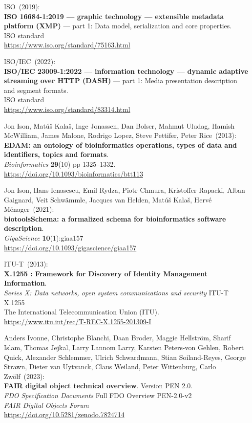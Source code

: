 \begin{thebibliography}{9}
ISO~(2019): \\
\textbf{{ISO} 16684-1:2019 --- graphic technology --- extensible metadata platform (XMP)} --- part 1: Data model, serialization and core properties.\\
ISO standard\\
\url{https://www.iso.org/standard/75163.html}

ISO/IEC~(2022): \\
\textbf{{ISO}/{IEC} 23009-1:2022 --- information technology ---
dynamic adaptive streaming over HTTP (DASH)} --- part 1: Media
presentation description and segment formats.\\
ISO standard\\
\url{https://www.iso.org/standard/83314.html}


Jon Ison, Matúš Kalaš, Inge Jonassen, Dan Bolser, Mahmut
Uludag, Hamish McWilliam, James Malone, Rodrigo Lopez, Steve Pettifer,
Peter Rice~(2013): \\
\textbf{EDAM: an ontology of bioinformatics operations, types of data
and identifiers, topics and formats}.\\
\emph{Bioinformatics} \textbf{29}(10) pp 1325--1332.\\
\url{https://doi.org/10.1093/bioinformatics/btt113}

Jon Ison, Hans Ienasescu, Emil Rydza, Piotr Chmura, Kristoffer
Rapacki, Alban Gaignard, Veit Schwämmle, Jacques van Helden, Matúš
Kalaš, Hervé Ménager~(2021): \\
\textbf{biotoolsSchema: a formalized schema for bioinformatics software description}.\\
\emph{GigaScience} \textbf{10}(1):giaa157\\
\url{https://doi.org/10.1093/gigascience/giaa157}

ITU-T~(2013): \\
\textbf{X.1255 : Framework for Discovery of Identity Management Information}.\\
\emph{Series X: Data networks, open system communications and security} ITU-T X.1255 \\
The International Telecommunication Union (ITU).\\
\url{https://www.itu.int/rec/T-REC-X.1255-201309-I}

Anders Ivonne, Christophe Blanchi, Daan Broder, Maggie Hellström, Sharif Islam, Thomas Jejkal, Larry Lannom Larry, Karsten Peters-von Gehlen, Robert Quick,
Alexander Schlemmer, Ulrich Schwardmann, Stian Soiland-Reyes,
George Strawn, Dieter van Uytvanck, Claus Weiland, Peter Wittenburg,
Carlo Zwölf~(2023): \\
\textbf{{FAIR} digital object technical overview}. Version PEN 2.0.\\
\emph{FDO Specification Documents} Full FDO Overview PEN-2.0-v2 \\
\emph{FAIR Digital Objects Forum}\\
\url{https://doi.org/10.5281/zenodo.7824714}


\end{thebibliography}
